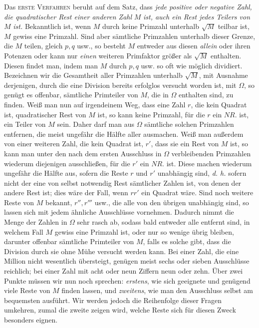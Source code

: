 Das \textsc{erste Verfahren} beruht auf dem Satz, dass \textit{jede positive oder} \textit{negative Zahl, die quadratischer Rest einer anderen Zahl} \(M\) \textit{ist, auch ein Rest jedes} \textit{Teilers von} \(M\) \textit{ist.} Bekanntlich ist, wenn \(M\) durch keine Primzahl unterhalb \(\surd M\) teilbar ist, \(M\) gewiss eine Primzahl. Sind aber sämtliche Primzahlen unterhalb dieser Grenze, die \(M\) teilen, gleich \(p,\allowbreak q\) usw., so besteht \(M\) entweder aus diesen \textit{allein} oder ihren Potenzen oder kann nur \textit{einen} weiteren Primfaktor größer als \(\surd M\) enthalten. Diesen findet man, indem man \(M\) durch \(p,\allowbreak q\) usw. so oft wie möglich dividiert. Bezeichnen wir die Gesamtheit aller Primzahlen unterhalb \(\surd M\), mit Ausnahme derjenigen, durch die eine Division bereits erfolglos versucht worden ist, mit \(\Omega\), so genügt es offenbar,
sämtliche Primteiler von \(M\), die in \(\Omega\) enthalten sind, zu finden. Weiß man nun auf irgendeinem Weg, dass eine Zahl \(r\), die kein Quadrat ist, quadratischer Rest von \(M\) ist, so kann keine Primzahl, für die \(r\) ein \(NR.\) ist, ein Teiler von \(M\) sein. Daher darf man aus \(\Omega\) sämtliche solchen Primzahlen entfernen, die meist ungefähr die Hälfte aller ausmachen. Weiß man außerdem von einer weiteren Zahl, die kein Quadrat ist, \(r'\), dass sie ein Rest von \(M\) ist, so kann man unter den nach dem ersten Ausschluss in \(\Omega\) verbleibenden Primzahlen wiederum diejenigen ausschließen, für die \(r'\) ein \(NR.\) ist. Diese machen wiederum ungefähr die Hälfte aus, sofern die Reste \(r\) und \(r'\) unabhängig sind, \textit{d. h.} sofern nicht der eine von selbst notwendig Rest sämtlicher Zahlen ist, von denen der andere Rest ist; dies wäre der Fall, wenn \(rr'\) ein Quadrat wäre. Sind noch weitere Reste von \(M\) bekannt, \(r'',\allowbreak r'''\) usw., die alle von den übrigen unabhängig sind, so lassen sich mit jedem ähnliche Ausschlüsse vornehmen. Dadurch nimmt die Menge der Zahlen in \(\Omega\) sehr rasch ab, sodass bald entweder alle entfernt sind, in welchem Fall \(M\) gewiss eine Primzahl ist, oder nur so wenige übrig bleiben, darunter offenbar sämtliche Primteiler von \(M\), falls es solche gibt, dass die Division durch sie ohne Mühe versucht werden kann. Bei einer Zahl, die eine Million nicht wesentlich übersteigt, genügen meist sechs oder sieben Ausschlüsse reichlich; bei einer Zahl mit acht oder neun Ziffern neun oder zehn. Über zwei Punkte müssen wir nun noch sprechen: \textit{erstens}, wie sich geeignete und genügend viele Reste von \(M\) finden lassen, und \textit{zweitens}, wie man den Ausschluss selbst am bequemsten ausführt. Wir werden jedoch die Reihenfolge dieser Fragen umkehren, zumal die zweite zeigen wird, welche Reste sich für diesen Zweck besonders eignen.
